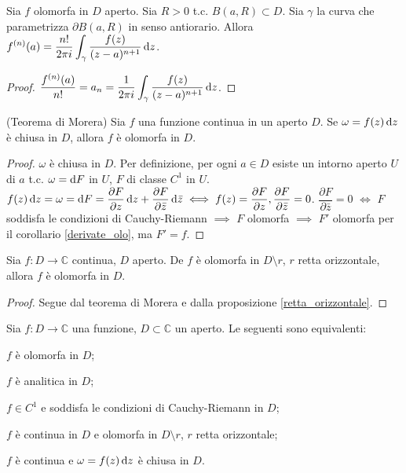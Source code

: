 \begin{cor}
  Sia $f$ olomorfa in $D$ aperto. Sia $R>0$ t.c. $B(a, R) \subset D$. Sia $\gamma$ la curva che parametrizza $\partial B(a, R)$ in senso antiorario. Allora $\displaystyle f^{(n)}(a)=\frac{n!}{2\pi i}\int_{\gamma}\frac{f(z)}{(z-a)^{n+1}}\mathop{}\!\mathrm{d} z$.
\end{cor}

\begin{proof}
  $\displaystyle \frac{f^{(n)}(a)}{n!}=a_n=\frac{1}{2\pi i}\int_{\gamma}\frac{f(z)}{(z-a)^{n+1}}\mathop{}\!\mathrm{d} z$.
\end{proof}

\begin{thm}
  (Teorema di Morera) Sia $f$ una funzione continua in un aperto $D$. Se $\omega=f(z)\mathop{}\!\mathrm{d} z$ è chiusa in $D$, allora $f$ è olomorfa in $D$.
\end{thm}

\begin{proof}
  $\omega$ è chiusa in $D$. Per definizione, per ogni $a \in D$ esiste un intorno aperto $U$ di $a$ t.c. $\omega=\mathop{}\!\mathrm{d} F$ in $U$, $F$ di classe $C^1$ in $U$.
  $f(z)\mathop{}\!\mathrm{d} z=\omega=\mathop{}\!\mathrm{d} F=\dfrac{\partial F}{\partial z}\mathop{}\!\mathrm{d} z+\dfrac{\partial F}{\partial\bar{z}}\mathop{}\!\mathrm{d}\bar{z} \iff f(z)=\dfrac{\partial F}{\partial z}, \dfrac{\partial F}{\partial\bar{z}}=0$.
  $\dfrac{\partial F}{\partial\bar{z}}=0$ $\iff$ $F$ soddisfa le condizioni di Cauchy-Riemann $\implies$ $F$ olomorfa $\implies$ $F'$ olomorfa per il corollario \ref{derivate_olo}, ma $F'=f$.
\end{proof}

\begin{cor}
  Sia $f:D \longrightarrow \mathbb{C}$ continua, $D$ aperto. De $f$ è olomorfa in $D \setminus r$, $r$ retta orizzontale, allora $f$ è olomorfa in $D$.
\end{cor}

\begin{proof}
  Segue dal teorema di Morera e dalla proposizione \ref{retta_orizzontale}.
\end{proof}

\begin{thm}
  Sia $f:D \longrightarrow \mathbb{C}$ una funzione, $D \subset \mathbb{C}$ un aperto. Le seguenti sono equivalenti:
  \begin{nlist}
    \item $f$ è olomorfa in $D$;
    \item $f$ è analitica in $D$;
    \item $f \in C^1$ e soddisfa le condizioni di Cauchy-Riemann in $D$;
    \item $f$ è continua in $D$ e olomorfa in $D\setminus r$, $r$ retta orizzontale;
    \item $f$ è continua e $\omega=f(z)\mathop{}\!\mathrm{d} z$ è chiusa in $D$.
  \end{nlist}
\end{thm}

